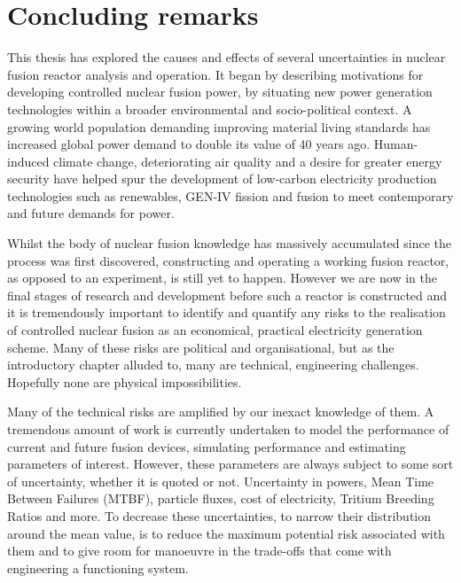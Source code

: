 
\chapter{Concluding remarks} %
\label{chap:conclusion}

\ifpdf
    \graphicspath{{Chapter4/Figs/Raster/}{Chapter4/Figs/PDF/}{Chapter4/Figs/}}
\else
    \graphicspath{{Chapter4/Figs/Vector/}{Chapter4/Figs/}}
\fi


This thesis has explored the causes and effects of several uncertainties in nuclear fusion reactor analysis and operation. It began by describing motivations for developing controlled nuclear fusion power, by situating new power generation technologies within a broader environmental and socio-political context. A growing world population demanding improving material living standards has increased global power demand to double its value of 40 years ago. Human-induced climate change, deteriorating air quality and a desire for greater energy security have helped spur the development of low-carbon electricity production technologies such as renewables, GEN-IV fission and fusion to meet contemporary and future demands for power.

Whilst the body of nuclear fusion knowledge has massively accumulated since the process was first discovered, constructing and operating a working fusion reactor, as opposed to an experiment, is still yet to happen. However we are now in the final stages of research and development before such a reactor is constructed and it is tremendously important to identify and quantify any risks to the realisation of controlled nuclear fusion as an economical, practical electricity generation scheme. Many of these risks are political and organisational, but as the introductory chapter alluded to, many are technical, engineering challenges. Hopefully none are physical impossibilities. 

Many of the technical risks are amplified by our inexact knowledge of them. A tremendous amount of work is currently undertaken to model the performance of current and future fusion devices, simulating performance and estimating parameters of interest. However, these parameters are always subject to some sort of uncertainty, whether it is quoted or not. Uncertainty in powers, Mean Time Between Failures (MTBF), particle fluxes, cost of electricity, Tritium Breeding Ratios and more. To decrease these uncertainties, to narrow their distribution around the mean value, is to reduce the maximum potential risk associated with them and to give room for manoeuvre in the trade-offs that come with engineering a functioning system. 


